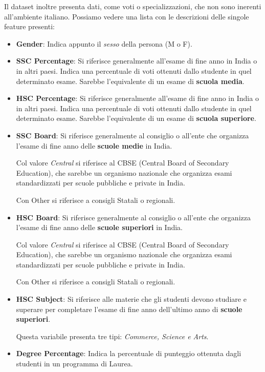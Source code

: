 \documentclass[12pt]{article}
\begin{document}
Il dataset inoltre presenta dati, come voti o specializzazioni, che non sono inerenti all'ambiente italiano. Possiamo vedere una lista con le descrizioni delle singole feature presenti:


\begin{itemize}
    \item \textbf{Gender}: Indica appunto il \textit{sesso} della persona (M o F).
    \item \textbf{SSC Percentage}: Si riferisce generalmente all'esame di fine anno in India o in altri paesi. Indica una percentuale di voti ottenuti dallo studente in quel determinato esame. Sarebbe l'equivalente di un esame di \textbf{scuola media}.
    \item \textbf{HSC Percentage}: Si riferisce generalmente all'esame di fine anno in India o in altri paesi. Indica una percentuale di voti ottenuti dallo studente in quel determinato esame. Sarebbe l'equivalente di un esame di \textbf{scuola superiore}.
    \item \textbf{SSC Board}: Si riferisce generalmente al consiglio o all'ente che organizza l'esame di fine anno delle \textbf{scuole medie} in India. \par Col valore \textit{Central} si riferisce al CBSE (Central Board of Secondary Education), che sarebbe un organismo nazionale che organizza esami standardizzati per scuole pubbliche e private in India. \par Con Other si riferisce a consigli Statali o regionali.
    \item \textbf{HSC Board}: Si riferisce generalmente al consiglio o all'ente che organizza l'esame di fine anno delle \textbf{scuole superiori} in India. \par Col valore \textit{Central} si riferisce al CBSE (Central Board of Secondary Education), che sarebbe un organismo nazionale che organizza esami standardizzati per scuole pubbliche e private in India. \par Con Other si riferisce a consigli Statali o regionali.
    \item \textbf{HSC Subject}: Si riferisce alle materie che gli studenti devono studiare e superare per completare l'esame di fine anno dell'ultimo anno di \textbf{scuole superiori}. \par Questa variabile presenta tre tipi: \textit{Commerce, Science e Arts}.
    \item \textbf{Degree Percentage}: Indica la percentuale di punteggio ottenuta dagli studenti in un programma di Laurea.

\end{itemize}
\end{document}
